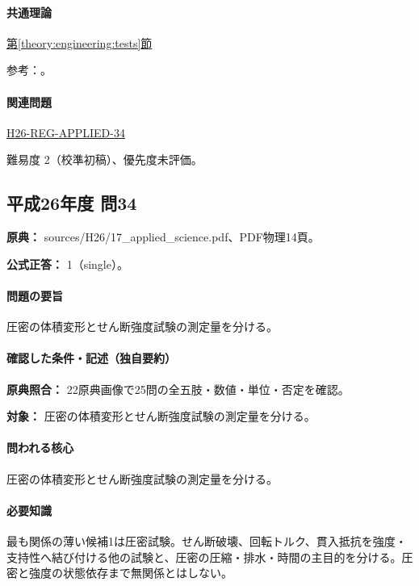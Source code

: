 \paragraph{共通理論} \hyperref[theory:engineering:tests]{第\ref*{theory:engineering:tests}節}

\par 参考：\cite{eng52_geotech_tests,eng52_consolidation}。

\paragraph{関連問題} \hyperref[q:h26-reg-applied-34]{H26-REG-APPLIED-34}

\par 難易度 2（校準初稿）、優先度未評価。

\subsection{平成26年度 問34}
\label{q:h26-reg-applied-34}

\noindent\textbf{原典：} sources/H26/17\_applied\_science.pdf、PDF物理14頁。

\textbf{公式正答：} 1（single）。

\paragraph{問題の要旨} 圧密の体積変形とせん断強度試験の測定量を分ける。

\paragraph{確認した条件・記述（独自要約）}\mbox{}\par

\noindent\textbf{原典照合：} 22原典画像で25問の全五肢・数値・単位・否定を確認。\par

\noindent\textbf{対象：} 圧密の体積変形とせん断強度試験の測定量を分ける。\par

\paragraph{問われる核心} 圧密の体積変形とせん断強度試験の測定量を分ける。

\paragraph{必要知識} 最も関係の薄い候補1は圧密試験。せん断破壊、回転トルク、貫入抵抗を強度・支持性へ結び付ける他の試験と、圧密の圧縮・排水・時間の主目的を分ける。圧密と強度の状態依存まで無関係とはしない。

